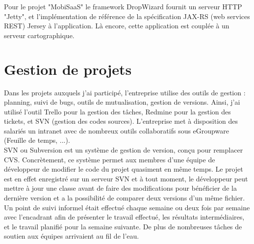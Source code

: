 Pour le projet "MobiSaaS" le framework DropWizard fournit un serveur HTTP "Jetty", et l'implémentation de référence de la spécification JAX-RS (web services REST) Jersey à l'application. Là encore, cette application est couplée à un serveur cartographique.\\

\section{Gestion de projets}

Dans les projets auxquels j'ai participé, l'entreprise utilise des outils de gestion : planning, suivi de bugs, outils de mutualisation, gestion de versions. Ainsi, j'ai utilisé l'outil Trello pour la gestion des tâches, Redmine pour la gestion des tickets, et SVN (gestion des codes sources). L'entreprise met à disposition des salariés un intranet avec de nombreux outils collaboratifs sous eGroupware (Feuille de temps, ...).\\

SVN ou Subversion est un système de gestion de version, conçu pour remplacer CVS. Concrètement, ce système permet aux membres d’une équipe de développeur de modifier le code du projet quasiment en même temps. Le projet est en effet enregistré sur un serveur SVN et à tout moment, le développeur peut mettre à jour une classe avant de faire des modifications pour bénéficier de la dernière version et a la possibilité de comparer deux versions d'un même fichier.\\

Un point de suivi informel était effectué chaque semaine ou deux fois par semaine avec l'encadrant afin de présenter le travail effectué, les résultats intermédiaires, et le travail planifié pour la semaine suivante. De plus de nombreuses tâches de soutien aux équipes arrivaient au fil de l'eau.\\

